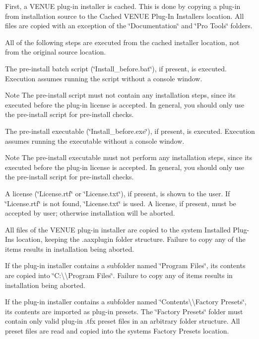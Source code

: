 \begin{DoxyEnumerate}
\item First, a V\+E\+N\+UE plug-\/in installer is cached. This is done by copying a plug-\/in from installation source to the Cached V\+E\+N\+UE Plug-\/\+In Installers location. All files are copied with an exception of the \char`\"{}\+Documentation\char`\"{} and \char`\"{}\+Pro Tools\char`\"{} folders.

All of the following steps are executed from the cached installer location, not from the original source location.  
\item The pre-\/install batch script (\char`\"{}\+Install\+\_\+before.\+bat\char`\"{}), if present, is executed. Execution assumes running the script without a console window.

\begin{DoxyNote}{Note}
The pre-\/install script must not contain any installation steps, since it\textquotesingle{}s executed before the plug-\/in license is accepted. In general, you should only use the pre-\/install script for pre-\/install checks.  
\end{DoxyNote}

\item The pre-\/install executable (\char`\"{}\+Install\+\_\+before.\+exe\char`\"{}), if present, is executed. Execution assumes running the executable without a console window.

\begin{DoxyNote}{Note}
The pre-\/install executable must not perform any installation steps, since it\textquotesingle{}s executed before the plug-\/in license is accepted. In general, you should only use the pre-\/install script for pre-\/install checks.  
\end{DoxyNote}

\item A license (\char`\"{}\+License.\+rtf\char`\"{} or \char`\"{}\+License.\+txt\char`\"{}), if present, is shown to the user. If \char`\"{}\+License.\+rtf\char`\"{} is not found, \char`\"{}\+License.\+txt\char`\"{} is used. A license, if present, must be accepted by user; otherwise installation will be aborted.  
\item All files of the V\+E\+N\+UE plug-\/in installer are copied to the system Installed Plug-\/\+Ins location, keeping the .aaxplugin folder structure. Failure to copy any of the items results in installation being aborted.  
\item If the plug-\/in installer contains a subfolder named \char`\"{}\+Program Files\char`\"{}, its contents are copied into \char`\"{}\+C\+:\textbackslash{}\textbackslash{}\+Program Files\char`\"{}. Failure to copy any of items results in installation being aborted.  
\item If the plug-\/in installer contains a subfolder named \char`\"{}\+Contents\textbackslash{}\textbackslash{}\+Factory Presets\char`\"{}, its contents are imported as plug-\/in presets. The \char`\"{}\+Factory Presets\char`\"{} folder must contain only valid plug-\/in .tfx preset files in an arbitrary folder structure. All preset files are read and copied into the system\textquotesingle{}s Factory Presets location.


\end{DoxyEnumerate}
